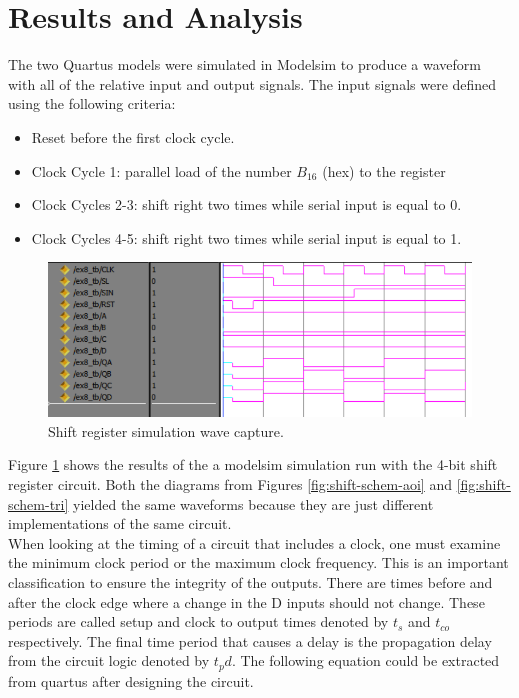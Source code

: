 \documentclass[CMPE]{KGCOEReport}
\begin{document}
\section*{Results and Analysis}

The two Quartus models were simulated in Modelsim to produce a waveform with all of the relative input and output signals. The input signals were defined using the following criteria:

\begin{itemize}
\item Reset before the first clock cycle.
\item Clock Cycle 1: parallel load of the number $B_{16}$ (hex) to the register
\item Clock Cycles 2-3: shift right two times while serial input is equal to 0.
\item Clock Cycles 4-5: shift right two times while serial input is equal to 1.
\end{itemize}

\begin{figure}[h!]
	\centering
	\includegraphics[width=\textwidth]{serial_shift.png}
	\caption{Shift register simulation wave capture.}
	\label{fig:reg-sim}
\end{figure}

Figure \ref{fig:reg-sim} shows the results of the a modelsim simulation run with the 4-bit shift register circuit. Both the diagrams from Figures \ref{fig:shift-schem-aoi} and \ref{fig:shift-schem-tri} yielded the same waveforms because they are just different implementations of the same circuit.\\

When looking at the timing of a circuit that includes a clock, one must examine the minimum clock period or the maximum clock frequency. This is an important classification to ensure the integrity of the outputs. There are times before and after the clock edge where a change in the D inputs should not change. These periods are called setup and clock to output times denoted by $t_s$ and $t_{co}$ respectively. The final time period that causes a delay is the propagation delay from the circuit logic denoted by $t_pd$. The following equation could be extracted from quartus after designing the circuit.
\end{document}
